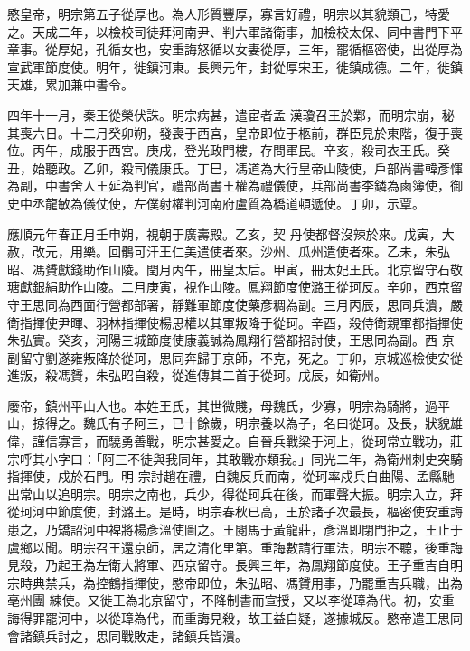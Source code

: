 
\begin{pinyinscope}

 愍皇帝，明宗第五子從厚也。為人形質豐厚，寡言好禮，明宗以其貌類己，特愛之。天成二年，以檢校司徒拜河南尹、判六軍諸衛事，加檢校太保、同中書門下平章事。從厚妃，孔循女也，安重誨怒循以女妻從厚，三年，罷循樞密使，出從厚為宣武軍節度使。明年，徙鎮河東。長興元年，封從厚宋王，徙鎮成德。二年，徙鎮天雄，累加兼中書令。



 四年十一月，秦王從榮伏誅。明宗病甚，遣宦者孟
 漢瓊召王於鄴，而明宗崩，秘其喪六日。十二月癸卯朔，發喪于西宮，皇帝即位于柩前，群臣見於東階，復于喪位。丙午，成服于西宮。庚戌，登光政門樓，存問軍民。辛亥，殺司衣王氏。癸丑，始聽政。乙卯，殺司儀康氏。丁巳，馮道為大行皇帝山陵使，戶部尚書韓彥惲為副，中書舍人王延為判官，禮部尚書王權為禮儀使，兵部尚書李鏻為鹵簿使，御史中丞龍敏為儀仗使，左僕射權判河南府盧質為橋道頓遞使。丁卯，示覃。



 應順元年春正月壬申朔，視朝于廣壽殿。乙亥，契
 丹使都督沒辣於來。戊寅，大赦，改元，用樂。回鶻可汗王仁美遣使者來。沙州、瓜州遣使者來。乙未，朱弘昭、馮贇獻錢助作山陵。閏月丙午，冊皇太后。甲寅，冊太妃王氏。北京留守石敬瑭獻銀絹助作山陵。二月庚寅，視作山陵。鳳翔節度使潞王從珂反。辛卯，西京留守王思同為西面行營都部署，靜難軍節度使藥彥稠為副。三月丙辰，思同兵潰，嚴衛指揮使尹暉、羽林指揮使楊思權以其軍叛降于從珂。辛酉，殺侍衛親軍都指揮使朱弘實。癸亥，河陽三城節度使康義誠為鳳翔行營都招討使，王思同為副。西
 京副留守劉遂雍叛降於從珂，思同奔歸于京師，不克，死之。丁卯，京城巡檢使安從進叛，殺馮贇，朱弘昭自殺，從進傳其二首于從珂。戊辰，如衛州。



 廢帝，鎮州平山人也。本姓王氏，其世微賤，母魏氏，少寡，明宗為騎將，過平山，掠得之。魏氏有子阿三，已十餘歲，明宗養以為子，名曰從珂。及長，狀貌雄偉，謹信寡言，而驍勇善戰，明宗甚愛之。自晉兵戰梁于河上，從珂常立戰功，莊宗呼其小字曰：「阿三不徒與我同年，其敢戰亦類我。」同光二年，為衛州刺史突騎指揮使，戍於石門。明
 宗討趙在禮，自魏反兵而南，從珂率戍兵自曲陽、孟縣馳出常山以追明宗。明宗之南也，兵少，得從珂兵在後，而軍聲大振。明宗入立，拜從珂河中節度使，封潞王。是時，明宗春秋已高，王於諸子次最長，樞密使安重誨患之，乃矯詔河中裨將楊彥溫使圖之。王閱馬于黃龍莊，彥溫即閉門拒之，王止于虞鄉以聞。明宗召王還京師，居之清化里第。重誨數請行軍法，明宗不聽，後重誨見殺，乃起王為左衛大將軍、西京留守。長興三年，為鳳翔節度使。王子重吉自明宗時典禁兵，為控鶴指揮使，愍帝即位，朱弘昭、馮贇用事，乃罷重吉兵職，出為亳州團
 練使。又徙王為北京留守，不降制書而宣授，又以李從璋為代。初，安重誨得罪罷河中，以從璋為代，而重誨見殺，故王益自疑，遂據城反。愍帝遣王思同會諸鎮兵討之，思同戰敗走，諸鎮兵皆潰。




\end{pinyinscope}
